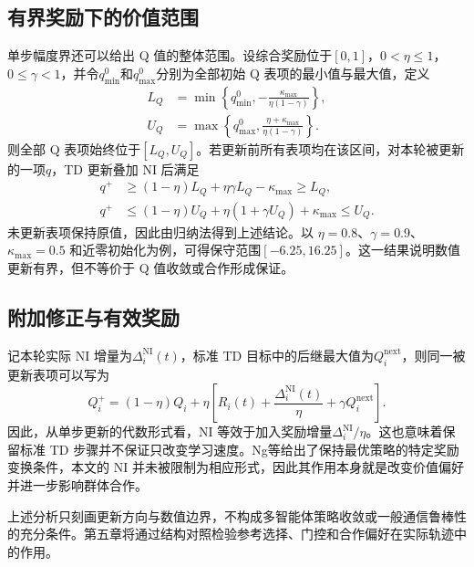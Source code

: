 \subsection{有界奖励下的价值范围}

单步幅度界还可以给出 Q 值的整体范围。设综合奖励位于$[0,1]$，$0<\eta\leq1$，$0\leq\gamma<1$，并令$q_{\min}^{0}$和$q_{\max}^{0}$分别为全部初始 Q 表项的最小值与最大值，定义
\begin{equation}
 \begin{aligned}
 L_Q&=\min\left\{q_{\min}^{0},-\frac{\kappa_{\max}}{\eta(1-\gamma)}\right\},\\
 U_Q&=\max\left\{q_{\max}^{0},\frac{\eta+\kappa_{\max}}{\eta(1-\gamma)}\right\}.
 \end{aligned}
 \label{eq:w2-q-range}
\end{equation}
则全部 Q 表项始终位于$[L_Q,U_Q]$。若更新前所有表项均在该区间，对本轮被更新的一项$q$，TD 更新叠加 NI 后满足
\begin{equation}
 \begin{aligned}
 q^+&\geq(1-\eta)L_Q+\eta\gamma L_Q-\kappa_{\max}\geq L_Q,\\
 q^+&\leq(1-\eta)U_Q+\eta(1+\gamma U_Q)+\kappa_{\max}\leq U_Q.
 \end{aligned}
 \label{eq:w2-q-range-proof}
\end{equation}
未更新表项保持原值，因此由归纳法得到上述结论。以 $\eta=0.8$、$\gamma=0.9$、$\kappa_{\max}=0.5$ 和近零初始化为例，可得保守范围$[-6.25,16.25]$。这一结果说明数值更新有界，但不等价于 Q 值收敛或合作形成保证。

\subsection{附加修正与有效奖励}

记本轮实际 NI 增量为$\Delta_i^{\mathrm{NI}}(t)$，标准 TD 目标中的后继最大值为$Q_i^{\mathrm{next}}$，则同一被更新表项可以写为
\begin{equation}
 Q_i^+=(1-\eta)Q_i+\eta\left[R_i(t)+\frac{\Delta_i^{\mathrm{NI}}(t)}{\eta}
                  +\gamma Q_i^{\mathrm{next}}\right].
 \label{eq:w2-effective-reward}
\end{equation}
因此，从单步更新的代数形式看，NI 等效于加入奖励增量$\Delta_i^{\mathrm{NI}}/\eta$。这也意味着保留标准 TD 步骤并不保证只改变学习速度。Ng等给出了保持最优策略的特定奖励变换条件\cite{ng1999policy}，本文的 NI 并未被限制为相应形式，因此其作用本身就是改变价值偏好并进一步影响群体合作。

上述分析只刻画更新方向与数值边界，不构成多智能体策略收敛或一般通信鲁棒性的充分条件。第五章将通过结构对照检验参考选择、门控和合作偏好在实际轨迹中的作用。

